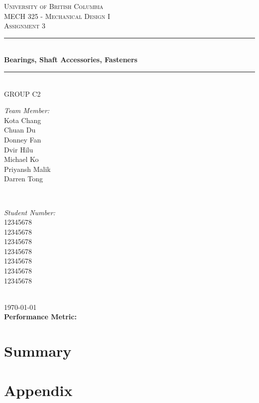 \documentclass[letterpaper,12pt]{article}
\begin{document}
	
\begin{titlepage}
	
	\newcommand{\HRule}{\rule{\linewidth}{0.5mm}}
	
	\center
	
	\textsc{\LARGE University of British Columbia}\\[1.5cm]
	\textsc{\Large MECH 325 - Mechanical Design I}\\[0.5cm]
	\textsc{\Large Assignment 3}\\[0.5cm]
	
	\HRule \\[0.8cm]
	{ \huge \bfseries Bearings, Shaft Accessories, Fasteners}\\[0.4cm]
	\HRule \\[1cm]
	
	{\Large GROUP C2}\\
	\vspace{0.5cm}
	
	\begin{minipage}{0.4\textwidth}
		\begin{flushleft} \large
			\emph{Team Member:}\\
			Kota Chang\\
			Chuan Du\\
			Donney Fan\\
			Dvir Hilu\\
			Michael Ko\\
			Priyansh Malik\\
			Darren Tong\\
		\end{flushleft}
	\end{minipage}
	~
	\begin{minipage}{0.4\textwidth}
		\begin{flushright} \large
			\emph{Student Number:} \\
			12345678\\
			12345678\\
			12345678\\
			12345678\\
			12345678\\
			12345678\\
			12345678
			
		\end{flushright}
	\end{minipage}\\[2cm]
	
	{\large \today}\\[2cm]
	
	{\Large\textbf{
		Performance Metric:
	}}
	
	
	\vfill %
	
\end{titlepage}

\section{Summary}

\newpage

\section{Appendix}
\end{document}

